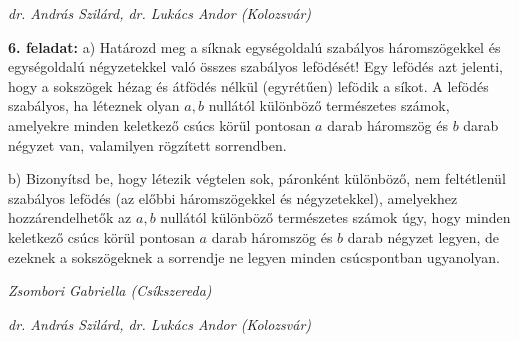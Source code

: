 \documentclass[a4paper,10pt]{article}
\newcommand{\ki}[2]{\hfill {\it #1 (#2)}\medskip}
\begin{document}
\ki{dr. András Szilárd, dr. Lukács Andor}{Kolozsvár}\medskip

{\bf 6. feladat: } a) Határozd meg a síknak egységoldalú szabályos
háromszögekkel és egy\-ség\-oldalú négyzetekkel való
összes szabályos lefödését! Egy lefödés azt jelenti,
hogy a sokszögek hézag és átfödés nélkül (egyrétűen) lefödik a síkot. A lefödés szabályos, ha léteznek
olyan $a,b$ nullától különböző természetes számok,
a\-me\-lyekre minden keletkező csúcs körül pontosan $a$
darab háromszög és $b$ darab négyzet van, valamilyen
rögzített sorrendben.

b) Bizonyítsd be, hogy létezik végtelen sok, páronként
különböző, nem feltétlenül sza\-bá\-lyos lefödés
(az előbbi háromszögekkel és négyzetekkel), amelyekhez
hozzárendelhetők az $a,b$ nullától különböző
termé\-sze\-tes számok úgy, hogy minden keletkező csúcs
körül pontosan $a$ darab háromszög és $b$ darab négyzet
legyen, de ezeknek a sokszögeknek a sorrendje ne legyen minden
csúcspontban ugyanolyan.


\ki{Zsombori Gabriella}{Csíkszereda}


\ki{dr. András Szilárd, dr. Lukács Andor}{Kolozsvár}
\end{document}
